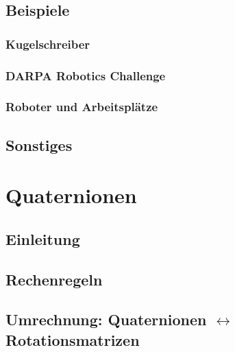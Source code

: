 \documentclass[a4paper, 11pt, accentcolor = tud3b]{tudreport}
\begin{document}
		\section{Beispiele} %

			\subsection{Kugelschreiber} %

			\subsection{DARPA Robotics Challenge} %

			\subsection{Roboter und Arbeitsplätze} %

		\section{Sonstiges} %





	\appendix

	\chapter{Quaternionen} %

		\section{Einleitung} %

		\section{Rechenregeln} %

		\section{Umrechnung: Quaternionen \(\leftrightarrow\) Rotationsmatrizen} %
\end{document}
